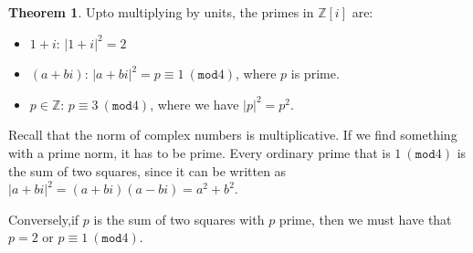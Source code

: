 \documentclass{book}
\theoremstyle{definition}
\newtheorem{theorem}{Theorem}
\newcommand{\Z}{\mathbb Z}
\renewcommand{\mod}[1]{\left( \texttt{mod} #1 \right)}
\begin{document}
\begin{theorem}
Upto multiplying by units, the primes in $\Z[i]$ are:
\begin{itemize}
\item $1 + i$: $|1 + i|^2 = 2$
\item $(a + bi)$: $|a + bi|^2 = p \equiv 1~\mod{4}$, where $p$ is prime.
\item $p \in \Z$: $p \equiv 3~\mod{4}$, where we have $|p|^2 = p^2$.
\end{itemize}

Recall that the norm of complex numbers is multiplicative. If we find something
with a prime norm, it has to be prime. Every ordinary prime that is $1~\mod{4}$
is the sum of two squares, since it can be written as
$|a+bi|^2 = (a + bi)(a - bi) = a^2 + b^2$.

Conversely,if $p$ is the sum of two squares with $p$ prime, then we must have that
$p = 2$ or $p \equiv 1~\mod{4}$.
\end{theorem}
\end{document}
